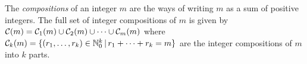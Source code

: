 \documentclass[11pt]{article}
\numberwithin{equation}{section}
\begin{document}
\begin{prop}
\label{prop:wavefunction-infinite-recursion}
\end{prop}

\begin{dfn}\label{dfn:integer-compositions}
The \textit{compositions} of an integer $m$ are the ways of writing $m$ as a sum of positive integers.
The full set of integer compositions of $m$ is given by
$
  \mathcal{C}(m)
=
  \mathcal{C}_1(m)
  \cup
  \mathcal{C}_2(m)
  \cup
  \cdots
  \cup
  \mathcal{C}_m(m)
$
where
$
  \mathcal{C}_k(m)
=
  \{
    (r_1,\ldots,r_k)\in\mathbb{N}_0^k
  \,|\,
    r_1+\cdots+r_k
  =
    m
  \}
$
are the integer compositions of $m$ into $k$ parts.
\end{dfn}
\end{document}

